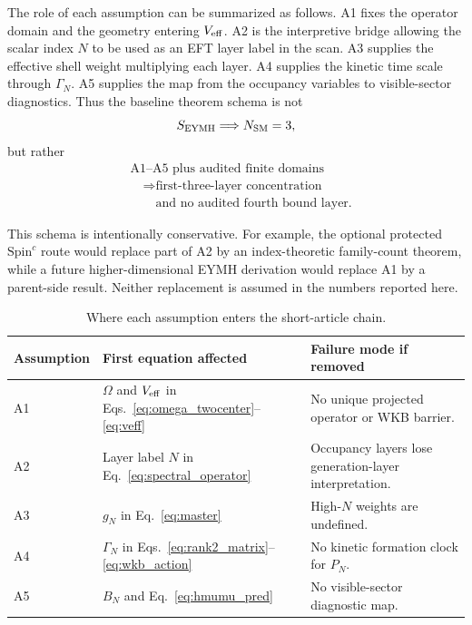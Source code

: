 \documentclass[pdflatex,sn-mathphys-num,iicol]{sn-jnl}
\begin{document}
The role of each assumption can be summarized as follows.
A1 fixes the operator domain and the geometry entering \(V_{\rm eff}\).
A2 is the interpretive bridge allowing the scalar index \(N\) to be used as an EFT layer label in the scan.
A3 supplies the effective shell weight multiplying each layer.
A4 supplies the kinetic time scale through \(\Gamma_N\).
A5 supplies the map from the occupancy variables to visible-sector diagnostics.
Thus the baseline theorem schema is not
\begin{equation}
    S_{\rm EYMH}\Longrightarrow N_{\rm SM}=3,
\end{equation}
but rather
\begin{equation}
    \begin{aligned}
    &\text{A1--A5 plus audited finite domains}
    \\
    &\quad\Longrightarrow
    \text{first-three-layer concentration}
    \\
    &\qquad\text{and no audited fourth bound layer}.
    \end{aligned}
    \label{eq:claim_schema}
\end{equation}

This schema is intentionally conservative.
For example, the optional protected \(\mathrm{Spin}^c\) route would replace part of A2 by an index-theoretic family-count theorem, while a future higher-dimensional EYMH derivation would replace A1 by a parent-side result.
Neither replacement is assumed in the numbers reported here.

\begin{table}[t]
\centering
\caption{Where each assumption enters the short-article chain.}
\label{tab:assumption_dependency}
\small
\setlength{\tabcolsep}{4pt}
\renewcommand{\arraystretch}{1.12}
\begin{tabular}{@{}l l l@{}}
\toprule
\textbf{Assumption} & \textbf{First equation affected} & \textbf{Failure mode if removed} \\
\midrule
A1 & \(\Omega\) and \(V_{\rm eff}\) in Eqs.~\eqref{eq:omega_twocenter}--\eqref{eq:veff} & No unique projected operator or WKB barrier. \\
A2 & Layer label \(N\) in Eq.~\eqref{eq:spectral_operator} & Occupancy layers lose generation-layer interpretation. \\
A3 & \(g_N\) in Eq.~\eqref{eq:master} & High-\(N\) weights are undefined. \\
A4 & \(\Gamma_N\) in Eqs.~\eqref{eq:rank2_matrix}--\eqref{eq:wkb_action} & No kinetic formation clock for \(P_N\). \\
A5 & \(B_N\) and Eq.~\eqref{eq:hmumu_pred} & No visible-sector diagnostic map. \\
\bottomrule
\end{tabular}
\end{table}
\end{document}
